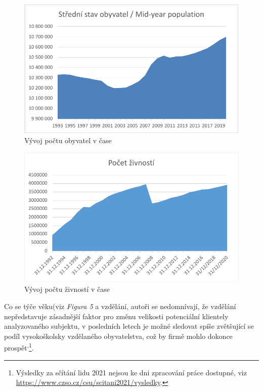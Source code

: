 \begin{figure}[!hbtp]
	\centering
	\includegraphics[width=0.8\linewidth]{Parts/InternalResources/CHART_Population_in_time.pdf}
	\caption[Vývoj počtu obyvatel v čase]{Vývoj počtu obyvatel v čase}
	\label{fig:Vyvoj poctu obyvatel v case}
\end{figure}

\newpage

\begin{figure}[!hbtp]
	\centering
	\includegraphics[width=0.8\linewidth]{Parts/InternalResources/CHART_Zivnosti_in_time.pdf}
	\caption[Vývoj počtu živností v čase]{Vývoj počtu živností v čase}
	\label{fig:Vyvoj poctu zivnosti v case}
\end{figure}

Co se týče věku(viz \textit{Figura 5} a vzdělání, autoři se nedomnívají, že vzdělání nepředstavuje zásadnější faktor pro změnu velikosti potenciální klientely analyzovaného subjektu, v posledních letech je možné sledovat spíše zvětšující se podíl vysokoškolsky vzdělaného obyvatelstva, což by firmě mohlo dokonce prospět\textsuperscript{,}\footnote{Výsledky za sčítání lidu 2021 nejsou ke dni zpracování práce dostupné, viz \url{https://www.czso.cz/csu/scitani2021/vysledky}.}.\\

